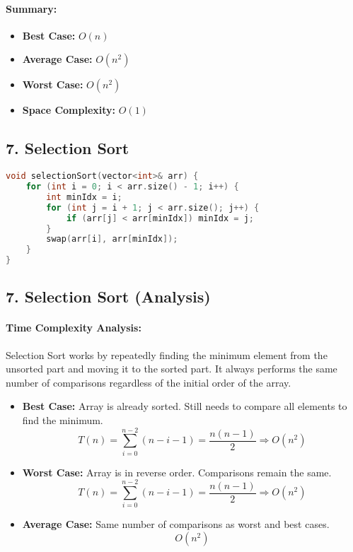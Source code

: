 \paragraph{Summary:}

\begin{itemize}
  \item \textbf{Best Case:} \(\boxed{O(n)}\)
  \item \textbf{Average Case:} \(\boxed{O(n^2)}\)
  \item \textbf{Worst Case:} \(\boxed{O(n^2)}\)
  \item \textbf{Space Complexity:} \(\boxed{O(1)}\)
\end{itemize}


\subsection*{\textbf{7. Selection Sort}}
\begin{lstlisting}[language=C++, caption=Selection Sort]
void selectionSort(vector<int>& arr) {
    for (int i = 0; i < arr.size() - 1; i++) {
        int minIdx = i;
        for (int j = i + 1; j < arr.size(); j++) {
            if (arr[j] < arr[minIdx]) minIdx = j;
        }
        swap(arr[i], arr[minIdx]);
    }
}
\end{lstlisting}

\subsection*{\textbf{7. Selection Sort (Analysis)}}

\paragraph{Time Complexity Analysis:}

Selection Sort works by repeatedly finding the minimum element from the unsorted part and moving it to the sorted part. It always performs the same number of comparisons regardless of the initial order of the array.

\begin{itemize}
  \item \textbf{Best Case:} Array is already sorted. Still needs to compare all elements to find the minimum.
  \[
  T(n) = \sum_{i=0}^{n-2} (n - i - 1) = \frac{n(n - 1)}{2} \Rightarrow \boxed{O(n^2)}
  \]

  \item \textbf{Worst Case:} Array is in reverse order. Comparisons remain the same.
  \[
  T(n) = \sum_{i=0}^{n-2} (n - i - 1) = \frac{n(n - 1)}{2} \Rightarrow \boxed{O(n^2)}
  \]

  \item \textbf{Average Case:} Same number of comparisons as worst and best cases.
  \[
  \boxed{O(n^2)}
  \]
\end{itemize}

